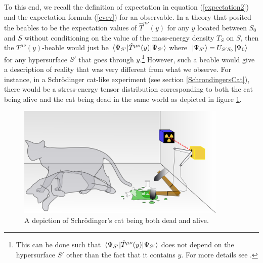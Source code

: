 To this end, we recall the definition of expectation in equation (\ref{expectation2}) and the expectation formula (\ref{evev}) for an observable. In a theory that posited the beables to be the expectation values of $\hat{T}^{\mu\nu}(y)$ for any $y$ located between $S_0$ and $S$  without conditioning on the value of the mass-energy density $T_S$ on $S$, then the $T^{\mu\nu}(y)$-beable would just be $\ev*{\hat{T}^{\mu\nu}(y)}{\Psi_{S'}}$ where $\ket*{\Psi_{S'}}=U_{S'S_0}\ket{\Psi_0}$ for any hypersurface $S'$ that goes through $y$.\footnote{This can be done such that $\ev*{\hat{T}^{\mu\nu}(y)}{\Psi_{S'}}$ does not depend on the hypersurface $S'$ other than the fact that it contains $y$. For more details see \cite{SchwingerJulianI}.} However, such a beable would give a description of reality that was very different from what we observe. For instance, in a Schr\"{o}dinger cat-like experiment (see section \ref{SchrondingersCat}), there would be a stress-energy tensor distribution corresponding to both the cat being alive and the cat being dead in the same world as depicted in figure \ref{deadlivecat}.
\begin{figure}[ht!]
  \captionsetup{justification=justified}
  \centering
  \includegraphics[width=100mm]{Chapter03/Schrodingers_cat.png}
  \caption[Depiction of Schr\"{o}dinger's cat]{A depiction of Schr\"{o}dinger's cat being both dead and alive.\protect\footnotemark}
  \label{deadlivecat}
  \end{figure}
